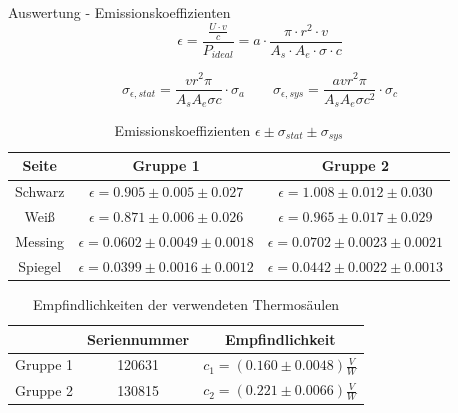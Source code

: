 \documentclass[12pt]{beamer}
\begin{document}
\begin{frame}{Auswertung - Emissionskoeffizienten}
\vskip -0.5cm
\begin{equation*}
\epsilon = \frac{\frac{U \cdot v}{c}}{P_{ideal}} = a \cdot \frac{\pi \cdot r^2 \cdot v}{A_s \cdot A_e \cdot \sigma \cdot c}
\end{equation*}

\begin{equation*}
\sigma_{\epsilon,stat}=\frac{v r^2 \pi}{A_s A_e \sigma c}\cdot  \sigma_a \qquad
\sigma_{\epsilon ,sys}=\frac{a v r^2 \pi}{A_sA_e \sigma c^2}\cdot \sigma_c
\end{equation*}

\begin{table}
	\small
	\begin{tabular}{|c|c|c|}
	\hline Seite & Gruppe 1& Gruppe 2 \\
	\hline Schwarz& $\epsilon=0.905 \pm 0.005\pm 0.027$ &  $\epsilon=1.008 \pm  0.012 \pm 0.030 $\\
	\hline Weiß & $\epsilon=0.871 \pm 0.006\pm 0.026$ & $\epsilon= 0.965\pm 0.017 \pm 0.029$\\
	\hline Messing & $\epsilon=0.0602 \pm 0.0049\pm 0.0018$ & $\epsilon=0.0702 \pm 0.0023\pm 0.0021$\\
	\hline Spiegel & $\epsilon=0.0399 \pm 0.0016\pm 0.0012$ & $\epsilon=0.0442 \pm 0.0022\pm 0.0013$\\
	\hline  
	\end{tabular}
	\caption{Emissionskoeffizienten $\epsilon \pm \sigma_{stat} \pm \sigma_{sys}$}
\end{table}
\vskip -0.5cm
\begin{table}[h]
	\small
	\centering
	\begin{tabular}{|c|c|c|}
		\hline          & Seriennummer & Empfindlichkeit \\
		\hline Gruppe 1 & 120631 &$c_1=(0.160 \pm   0.0048)\frac{V}{W} $ \\
		\hline Gruppe 2 & 130815  &$c_2=(0.221 \pm   0.0066)\frac{V}{W} $\\
		\hline
	\end{tabular}
	\caption{Empfindlichkeiten der verwendeten Thermosäulen}
\end{table}

\end{frame}
\end{document}
